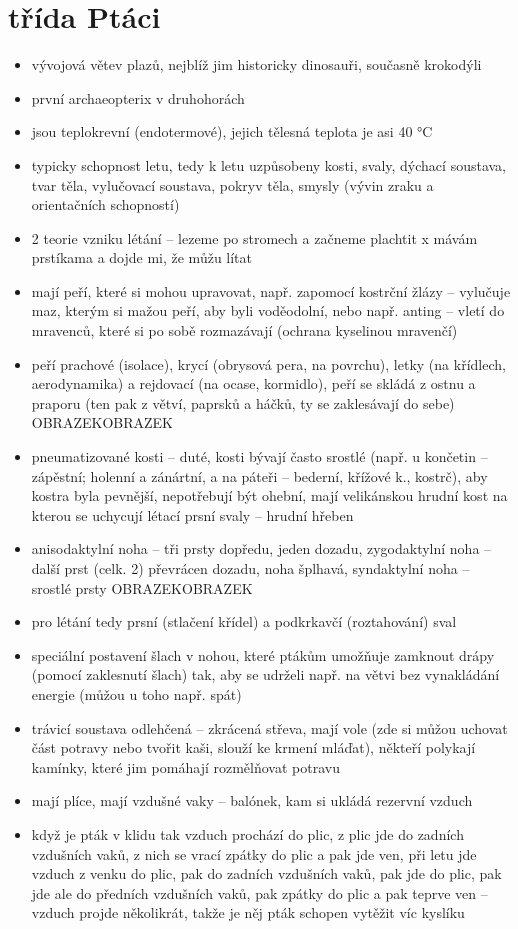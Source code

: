 \documentclass{article}
\begin{document}
\section{třída Ptáci}
\begin{itemize}
  \item vývojová větev plazů, nejblíž jim historicky dinosauři, současně krokodýli
  \item první archaeopterix v druhohorách
  \item jsou teplokrevní (endotermové), jejich tělesná teplota je asi 40 °C
  \item typicky schopnost letu, tedy k letu uzpůsobeny kosti, svaly, dýchací soustava, tvar těla, vylučovací soustava, pokryv těla, smysly (vývin zraku a orientačních schopností)
  \item 2 teorie vzniku létání -- lezeme po stromech a začneme plachtit x mávám prstíkama a dojde mi, že můžu lítat
  \item mají peří, které si mohou upravovat, např. zapomocí kostrční žlázy -- vylučuje maz, kterým si mažou peří, aby byli voděodolní, nebo např. anting -- vletí do mravenců, které si po sobě rozmazávají (ochrana kyselinou mravenčí)
  \item peří prachové (isolace), krycí (obrysová pera, na povrchu), letky (na křídlech, aerodynamika) a rejdovací (na ocase, kormidlo), peří se skládá z ostnu a praporu (ten pak z větví, paprsků a háčků, ty se zaklesávají do sebe) OBRAZEKOBRAZEK
  \item pneumatizované kosti -- duté, kosti bývají často srostlé (např. u končetin -- zápěstní; holenní a zánártní, a na páteři -- bederní, křížové k., kostrč), aby kostra byla pevnější, nepotřebují být ohební, mají velikánskou hrudní kost na kterou se uchycují létací prsní svaly -- hrudní hřeben
  \item anisodaktylní noha -- tři prsty dopředu, jeden dozadu, zygodaktylní noha -- další prst (celk. 2) převrácen dozadu, noha šplhavá, syndaktylní noha -- srostlé prsty OBRAZEKOBRAZEK
  \item pro létání tedy prsní (stlačení křídel) a podkrkavčí (roztahování) sval
  \item speciální postavení šlach v nohou, které ptákům umožňuje zamknout drápy (pomocí zaklesnutí šlach) tak, aby se udrželi např. na větvi bez vynakládání energie (můžou u toho např. spát)
  \item trávicí soustava odlehčená -- zkrácená střeva, mají vole (zde si můžou uchovat část potravy nebo tvořit kaši, slouží ke krmení mláďat), někteří polykají kamínky, které jim pomáhají rozmělňovat potravu
  \item mají plíce, mají vzdušné vaky -- balónek, kam si ukládá rezervní vzduch
  \item když je pták v klidu tak vzduch prochází do plic, z plic jde do zadních vzdušních vaků, z nich se vrací zpátky do plic a pak jde ven, při letu jde vzduch z venku do plic, pak do zadních vzdušních vaků, pak jde do plic, pak jde ale do předních vzdušních vaků, pak zpátky do plic a pak teprve ven -- vzduch projde několikrát, takže je něj pták schopen vytěžit víc kyslíku
\end{itemize}
\end{document}
